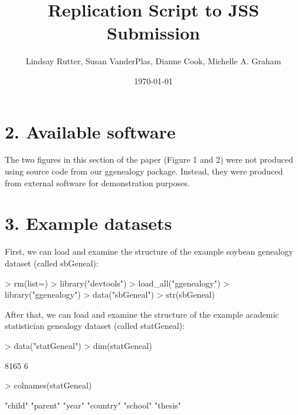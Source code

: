 \documentclass{article}
\title{Replication Script to JSS Submission}
\begin{document}
\author{Lindsay Rutter, Susan VanderPlas, Dianne Cook, Michelle A. Graham}
\date{\today}
\maketitle


\section*{2. Available software}

The two figures in this section of the paper (Figure 1 and 2) were not produced using source code from our ggenealogy package. Instead, they were produced from external software for demonstration purposes.

\section*{3. Example datasets}

First, we can load and examine the structure of the example soybean genealogy dataset (called sbGeneal):

\begin{Schunk}
\begin{Sinput}
> rm(list=)
> library("devtools")
> load_all("ggenealogy")
> library("ggenealogy")
> data("sbGeneal")
> str(sbGeneal)
\end{Sinput}
\end{Schunk}

After that, we can load and examine the structure of the example academic statistician genealogy dataset (called statGeneal):

\begin{Schunk}
\begin{Sinput}
> data("statGeneal")
> dim(statGeneal)
\end{Sinput}
\begin{Soutput}
[1] 8165    6
\end{Soutput}
\begin{Sinput}
> colnames(statGeneal)
\end{Sinput}
\begin{Soutput}
[1] "child"   "parent"  "year"    "country" "school"  "thesis" 
\end{Soutput}
\end{Schunk}
\end{document}
